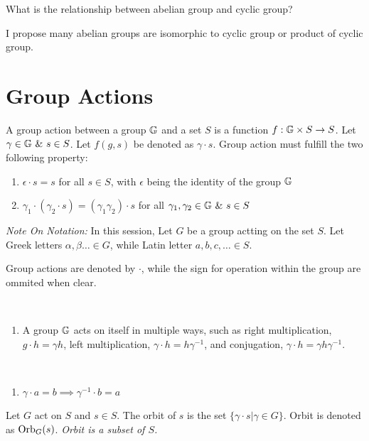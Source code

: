 \documentclass[../note.tex]{subfiles}
\begin{document}
\begin{hypothesis}
	What is the relationship between abelian group and cyclic group? 

	I propose many abelian groups are isomorphic to cyclic group or product of cyclic group.
\end{hypothesis}

\section{Group Actions}
\begin{definition}\label{def:group_action} \hypertarget{def:group_action}{}
	A group action between a group $\mathbb{G}$ and a set $S$ is a function $f: \mathbb{G}\times S \rightarrow S$. 
	Let $\gamma \in \mathbb{G} \ \&\ s \in S$. Let $f(g,s)$ be denoted as $\gamma\cdot s$. Group action must fulfill the two following property:
	\begin{enumerate}
		\item $\epsilon\cdot s=s$ for all $s\in S$, with $\epsilon$ being the identity of the group $\mathbb{G}$
		\item $\gamma_1\cdot(\gamma_2 \cdot s) = (\gamma_1 \gamma_2) \cdot s$ for all $\gamma_1, \gamma_2 \in \bb{G}\ \&\ s \in S$
	\end{enumerate}
\end{definition}

\emph{Note On Notation:}
In this session, Let $G$ be a group actting on the set $S$. Let Greek letters $\alpha, \beta \dots \in G$, while Latin letter $a,b,c, \dots \in S$. 

Group actions are denoted by $\cdot$, while the sign for operation within the group are ommited when clear.

\begin{example}
	\ 
\begin{enumerate}
	\item A group $\mathbb{G}$ acts on itself in multiple ways, such as right multiplication, $g\cdot h=\gamma h$, left multiplication, $\gamma\cdot h = h\gamma^{-1}$, and conjugation, $\gamma\cdot h = \gamma h\gamma^{-1}$.
\end{enumerate}
\end{example}
\begin{theorem}
	\ 
	\begin{enumerate}
		\item $\gamma \cdot a = b \implies \gamma^{-1} \cdot b = a$ 
	\end{enumerate}
\end{theorem}
\begin{definition}[Orbit] \label{def:orbit} \hypertarget{def:orbit_stabilizer}{}
	Let $G$ act on $S$ and $s \in S$. The orbit of $s$ is the set $\{\gamma\cdot s | \gamma \in G\}$. Orbit is denoted as $\text{Orb}_{G}({s})$.
	\emph{Orbit is a subset of $S$.}
\end{definition}
\end{document}
